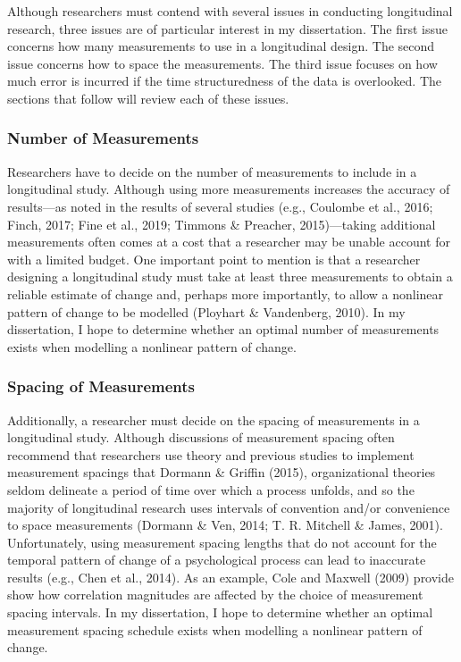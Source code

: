 \documentclass[
  english,
  man,floatsintext]{apa7}
\begin{document}
Although researchers must contend with several issues in conducting longitudinal research, three issues are of particular interest in my dissertation. The first issue concerns how many measurements to use in a longitudinal design. The second issue concerns how to space the measurements. The third issue focuses on how much error is incurred if the time structuredness of the data is overlooked. The sections that follow will review each of these issues.

\hypertarget{number-of-measurements}{%
\subsubsection{Number of Measurements}\label{number-of-measurements}}

Researchers have to decide on the number of measurements to include in a longitudinal study. Although using more measurements increases the accuracy of results---as noted in the results of several studies (e.g., Coulombe et al., 2016; Finch, 2017; Fine et al., 2019; Timmons \& Preacher, 2015)---taking additional measurements often comes at a cost that a researcher may be unable account for with a limited budget. One important point to mention is that a researcher designing a longitudinal study must take at least three measurements to obtain a reliable estimate of change and, perhaps more importantly, to allow a nonlinear pattern of change to be modelled (Ployhart \& Vandenberg, 2010). In my dissertation, I hope to determine whether an optimal number of measurements exists when modelling a nonlinear pattern of change.

\hypertarget{spacing-of-measurements}{%
\subsubsection{Spacing of Measurements}\label{spacing-of-measurements}}

Additionally, a researcher must decide on the spacing of measurements in a longitudinal study. Although discussions of measurement spacing often recommend that researchers use theory and previous studies to implement measurement spacings that Dormann \& Griffin (2015), organizational theories seldom delineate a period of time over which a process unfolds, and so the majority of longitudinal research uses intervals of convention and/or convenience to space measurements (Dormann \& Ven, 2014; T. R. Mitchell \& James, 2001). Unfortunately, using measurement spacing lengths that do not account for the temporal pattern of change of a psychological process can lead to inaccurate results (e.g., Chen et al., 2014). As an example, Cole and Maxwell (2009) provide show how correlation magnitudes are affected by the choice of measurement spacing intervals. In my dissertation, I hope to determine whether an optimal measurement spacing schedule exists when modelling a nonlinear pattern of change.
\end{document}
